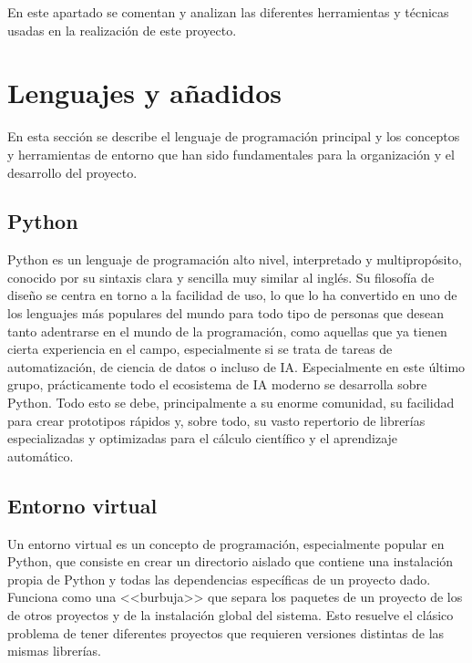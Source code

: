 

En este apartado se comentan y analizan las diferentes herramientas y técnicas usadas en la realización de este proyecto.

\section{Lenguajes y añadidos}

En esta sección se describe el lenguaje de programación principal y los conceptos y herramientas de entorno que han sido fundamentales para la organización y el desarrollo del proyecto.

\subsection{Python}


Python es un lenguaje de programación alto nivel, interpretado y multipropósito, conocido por su sintaxis clara y sencilla muy similar al inglés. Su filosofía de diseño se centra en torno a la facilidad de uso, lo que lo ha convertido en uno de los lenguajes más populares del mundo para todo tipo de personas que desean tanto adentrarse en el mundo de la programación, como aquellas que ya tienen cierta experiencia en el campo, especialmente si se trata de tareas de automatización, de ciencia de datos o incluso de IA. Especialmente en este último grupo, prácticamente todo el ecosistema de IA moderno se desarrolla sobre Python. Todo esto se debe, principalmente a su enorme comunidad, su facilidad para crear prototipos rápidos y, sobre todo, su vasto repertorio de librerías especializadas y optimizadas para el cálculo científico y el aprendizaje automático.

\subsection{Entorno virtual}


Un entorno virtual es un concepto de programación, especialmente popular en Python, que consiste en crear un directorio aislado que contiene una instalación propia de Python y todas las dependencias específicas de un proyecto dado. Funciona como una <<burbuja>> que separa los paquetes de un proyecto de los de otros proyectos y de la instalación global del sistema. Esto resuelve el clásico problema de tener diferentes proyectos que requieren versiones distintas de las mismas librerías.

